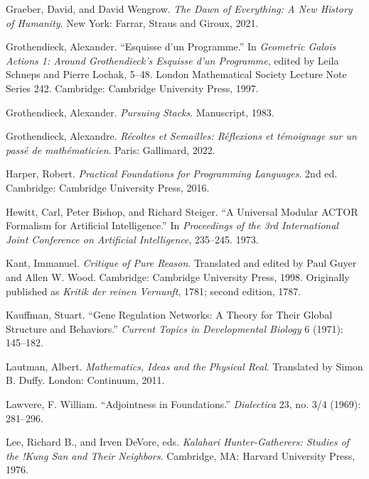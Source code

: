 \documentclass[11pt]{article}
\begin{document}
\begin{description}[leftmargin=0pt,labelwidth=0pt,itemindent=0pt,itemsep=0.55em]
\item Graeber, David, and David Wengrow. \emph{The Dawn of Everything: A New
History of Humanity}. New York: Farrar, Straus and Giroux, 2021.

\item Grothendieck, Alexander. ``Esquisse d'un Programme.'' In \emph{Geometric
Galois Actions 1: Around Grothendieck's Esquisse d'un Programme}, edited by
Leila Schneps and Pierre Lochak, 5--48. London Mathematical Society Lecture Note
Series 242. Cambridge: Cambridge University Press, 1997.

\item Grothendieck, Alexander. \emph{Pursuing Stacks}. Manuscript, 1983.

\item Grothendieck, Alexandre. \emph{Récoltes et Semailles: Réflexions et
témoignage sur un passé de mathématicien}. Paris: Gallimard, 2022.

\item Harper, Robert. \emph{Practical Foundations for Programming Languages}. 2nd
ed. Cambridge: Cambridge University Press, 2016.

\item Hewitt, Carl, Peter Bishop, and Richard Steiger. ``A Universal Modular
ACTOR Formalism for Artificial Intelligence.'' In \emph{Proceedings of the 3rd
International Joint Conference on Artificial Intelligence}, 235--245. 1973.

\item Kant, Immanuel. \emph{Critique of Pure Reason}. Translated and edited by
Paul Guyer and Allen W. Wood. Cambridge: Cambridge University Press, 1998.
Originally published as \emph{Kritik der reinen Vernunft}, 1781; second edition,
1787.

\item Kauffman, Stuart. ``Gene Regulation Networks: A Theory for Their Global
Structure and Behaviors.'' \emph{Current Topics in Developmental Biology} 6
(1971): 145--182.

\item Lautman, Albert. \emph{Mathematics, Ideas and the Physical Real}.
Translated by Simon B. Duffy. London: Continuum, 2011.

\item Lawvere, F. William. ``Adjointness in Foundations.'' \emph{Dialectica} 23,
no. 3/4 (1969): 281--296.

\item Lee, Richard B., and Irven DeVore, eds. \emph{Kalahari Hunter-Gatherers:
Studies of the !Kung San and Their Neighbors}. Cambridge, MA: Harvard
University Press, 1976.


\end{description}
\end{document}
